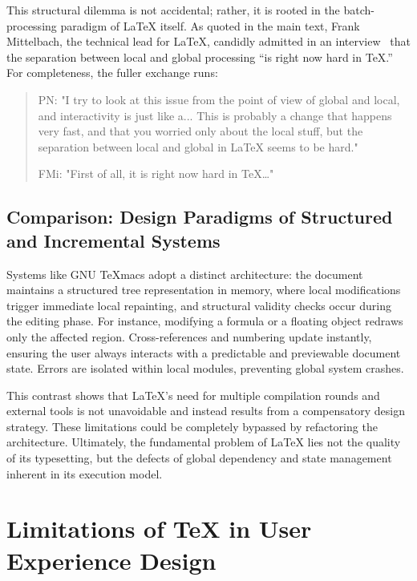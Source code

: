 This structural dilemma is not accidental; rather, it is rooted in the batch-processing paradigm of \LaTeX{} itself. As quoted in the main text, Frank Mittelbach, the technical lead for \LaTeX{}, candidly admitted in an interview~\cite{interview2021} that the separation between local and global processing ``is right now hard in \TeX{}.'' For completeness, the fuller exchange runs:

\begin{quotation}
  PN: "I try to look at this issue from the point of view of global and local, and interactivity is just like a... This is probably a change that happens very fast, and that you worried only about the local stuff, but the separation between local and global in \LaTeX{} seems to be hard."

  FMi: "First of all, it is right now hard in \TeX{}\ldots"
\end{quotation}

\subsection{Comparison: Design Paradigms of Structured and Incremental Systems}

Systems like GNU \TeX{}macs adopt a distinct architecture: the document maintains a structured tree representation in memory, where local modifications trigger immediate local repainting, and structural validity checks occur during the editing phase. For instance, modifying a formula or a floating object redraws only the affected region. Cross-references and numbering update instantly, ensuring the user always interacts with a predictable and previewable document state. Errors are isolated within local modules, preventing global system crashes.

This contrast shows that \LaTeX{}'s need for multiple compilation rounds and external tools is not unavoidable and instead results from a compensatory design strategy. These limitations could be completely bypassed by refactoring the architecture. Ultimately, the fundamental problem of \LaTeX{} lies not the quality of its typesetting, but the defects of global dependency and state management inherent in its execution model.

\section{Limitations of \TeX{} in User Experience Design}
\label{app:con}
\label{sec:ux}


